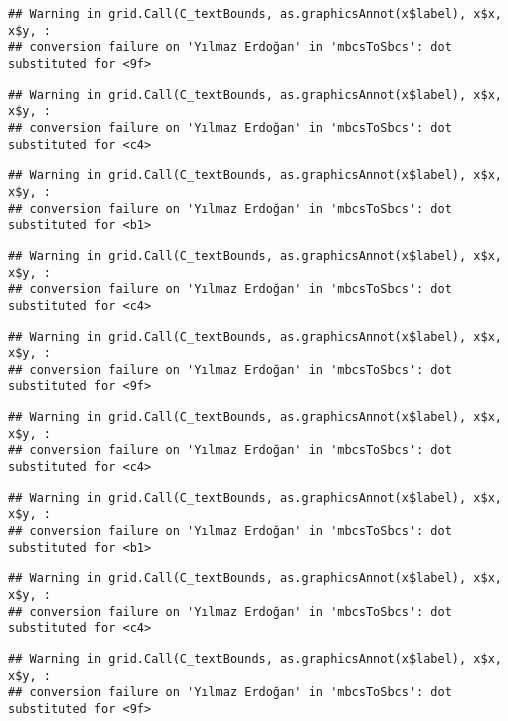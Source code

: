 \documentclass[
]{article}
\begin{document}
\begin{verbatim}
## Warning in grid.Call(C_textBounds, as.graphicsAnnot(x$label), x$x, x$y, :
## conversion failure on 'Yılmaz Erdoğan' in 'mbcsToSbcs': dot substituted for <9f>
\end{verbatim}

\begin{verbatim}
## Warning in grid.Call(C_textBounds, as.graphicsAnnot(x$label), x$x, x$y, :
## conversion failure on 'Yılmaz Erdoğan' in 'mbcsToSbcs': dot substituted for <c4>
\end{verbatim}

\begin{verbatim}
## Warning in grid.Call(C_textBounds, as.graphicsAnnot(x$label), x$x, x$y, :
## conversion failure on 'Yılmaz Erdoğan' in 'mbcsToSbcs': dot substituted for <b1>
\end{verbatim}

\begin{verbatim}
## Warning in grid.Call(C_textBounds, as.graphicsAnnot(x$label), x$x, x$y, :
## conversion failure on 'Yılmaz Erdoğan' in 'mbcsToSbcs': dot substituted for <c4>
\end{verbatim}

\begin{verbatim}
## Warning in grid.Call(C_textBounds, as.graphicsAnnot(x$label), x$x, x$y, :
## conversion failure on 'Yılmaz Erdoğan' in 'mbcsToSbcs': dot substituted for <9f>
\end{verbatim}

\begin{verbatim}
## Warning in grid.Call(C_textBounds, as.graphicsAnnot(x$label), x$x, x$y, :
## conversion failure on 'Yılmaz Erdoğan' in 'mbcsToSbcs': dot substituted for <c4>
\end{verbatim}

\begin{verbatim}
## Warning in grid.Call(C_textBounds, as.graphicsAnnot(x$label), x$x, x$y, :
## conversion failure on 'Yılmaz Erdoğan' in 'mbcsToSbcs': dot substituted for <b1>
\end{verbatim}

\begin{verbatim}
## Warning in grid.Call(C_textBounds, as.graphicsAnnot(x$label), x$x, x$y, :
## conversion failure on 'Yılmaz Erdoğan' in 'mbcsToSbcs': dot substituted for <c4>
\end{verbatim}

\begin{verbatim}
## Warning in grid.Call(C_textBounds, as.graphicsAnnot(x$label), x$x, x$y, :
## conversion failure on 'Yılmaz Erdoğan' in 'mbcsToSbcs': dot substituted for <9f>
\end{verbatim}
\end{document}
